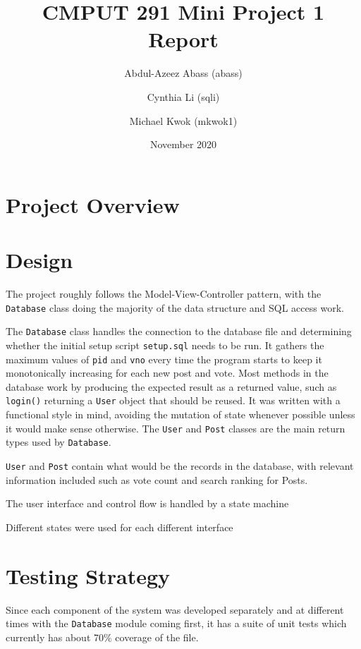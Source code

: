 \documentclass{article}
\title{CMPUT 291 Mini Project 1 Report}
\date{November 2020}
\author{Abdul-Azeez Abass (abass)\\
\and Cynthia Li (sqli)\\
\and Michael Kwok (mkwok1)}
\begin{document}
\maketitle

\section{Project Overview}

\section{Design}

The project roughly follows the Model-View-Controller pattern, with the \verb|Database| class doing the majority of the data structure and SQL access work. %

The \verb|Database| class handles the connection to the database file and determining whether the initial setup script \verb|setup.sql| needs to be run. It gathers the maximum values of \verb|pid| and \verb|vno| every time the program starts to keep it monotonically increasing for each new post and vote. Most methods in the database work by producing the expected result as a returned value, such as \verb|login()| returning a \verb|User| object that should be reused. It was written with a functional style in mind, avoiding the mutation of state whenever possible unless it would make sense otherwise. The \verb|User| and \verb|Post| classes are the main return types used by \verb|Database|.

\verb|User| and \verb|Post| contain what would be the records in the database, with relevant information included such as vote count and search ranking for Posts.

The user interface and control flow is handled by a state machine %

Different states were used for each different interface %


\section{Testing Strategy}
Since each component of the system was developed separately and at different times with the \verb|Database| module coming first, it has a suite of unit tests which currently has about 70\% coverage of the file.
\end{document}
